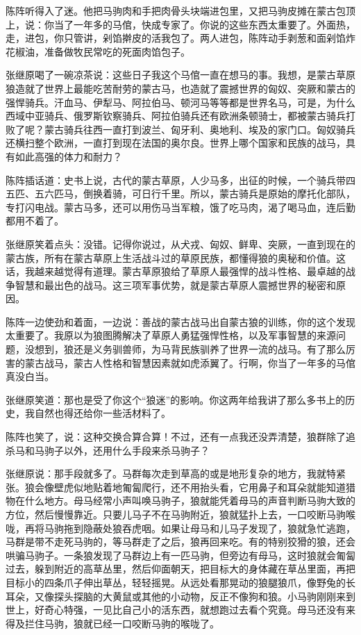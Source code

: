 \par 陈阵听得入了迷。他把马驹肉和手把肉骨头块端进包里，又把马驹皮摊在蒙古包顶上，说：你当了一年多的马倌，快成专家了。你说的这些东西太重要了。外面热，走，进包，你只管讲，剁馅擀皮的活我包了。两人进包，陈阵动手剥葱和面剁馅炸花椒油，准备做牧民常吃的死面肉馅包子。
\par 张继原喝了一碗凉茶说：这些日子我这个马倌一直在想马的事。我想，是蒙古草原狼造就了世界上最能吃苦耐劳的蒙古马，也造就了震撼世界的匈奴、突厥和蒙古的强悍骑兵。汗血马、伊犁马、阿拉伯马、顿河马等等都是世界名马，可是，为什么西域中亚骑兵、俄罗斯钦察骑兵、阿拉伯骑兵还有欧洲条顿骑士，都被蒙古骑兵打败了呢？蒙古骑兵往西一直打到波兰、匈牙利、奥地利、埃及的家门口。匈奴骑兵还横扫整个欧洲，一直打到现在法国的奥尔良。世界上哪个国家和民族的战马，具有如此高强的体力和耐力？
\par 陈阵插话道：史书上说，古代的蒙古草原，人少马多，出征的时候，一个骑兵带四五匹、五六匹马，倒换着骑，可日行千里。所以，蒙古骑兵是原始的摩托化部队，专打闪电战。蒙古马多，还可以用伤马当军粮，饿了吃马肉，渴了喝马血，连后勤都用不着了。
\par 张继原笑着点头：没错。记得你说过，从犬戎、匈奴、鲜卑、突厥，一直到现在的蒙古族，所有在蒙古草原上生活战斗过的草原民族，都懂得狼的奥秘和价值。这话，我越来越觉得有道理。蒙古草原狼给了草原人最强悍的战斗性格、最卓越的战争智慧和最出色的战马。这三项军事优势，就是蒙古草原人震撼世界的秘密和原因。
\par 陈阵一边使劲和着面，一边说：善战的蒙古战马出自蒙古狼的训练，你的这个发现太重要了。我原以为狼图腾解决了草原人勇猛强悍性格，以及军事智慧的来源问题，没想到，狼还是义务驯兽师，为马背民族驯养了世界一流的战马。有了那么厉害的蒙古战马，蒙古人性格和智慧因素就如虎添翼了。行啊，你当了一年多的马倌真没白当。
\par 张继原笑道：那也是受了你这个“狼迷”的影响。你这两年给我讲了那么多书上的历史，我自然也得还给你一些活材料了。
\par 陈阵也笑了，说：这种交换合算合算！不过，还有一点我还没弄清楚，狼群除了追杀马和马驹子以外，还用什么手段来杀马驹子？
\par 张继原说：那手段就多了。马群每次走到草高的或是地形复杂的地方，我就特紧张。狼会像壁虎似地贴着地匍匐爬行，还不用抬头看，它用鼻子和耳朵就能知道猎物在什么地方。母马经常小声叫唤马驹子，狼就能凭着母马的声音判断马驹大致的方位，然后慢慢靠近。只要儿马子不在马驹附近，狼就猛扑上去，一口咬断马驹喉咙，再将马驹拖到隐蔽处狼吞虎咽。如果让母马和儿马子发现了，狼就急忙逃跑，马群是带不走死马驹的，等马群走了之后，狼再回来吃。有的特别狡猾的狼，还会哄骗马驹子。一条狼发现了马群边上有一匹马驹，但旁边有母马，这时狼就会匍匐过去，躲到附近的高草丛里，然后仰面朝天，把目标大的身体藏在草丛里面，再把目标小的四条爪子伸出草丛，轻轻摇晃。从远处看那晃动的狼腿狼爪，像野兔的长耳朵，又像探头探脑的大黄鼠或其他的小动物，反正不像狗和狼。小马驹刚刚来到世上，好奇心特强，一见比自己小的活东西，就想跑过去看个究竟。母马还没有来得及拦住马驹，狼就已经一口咬断马驹的喉咙了。
